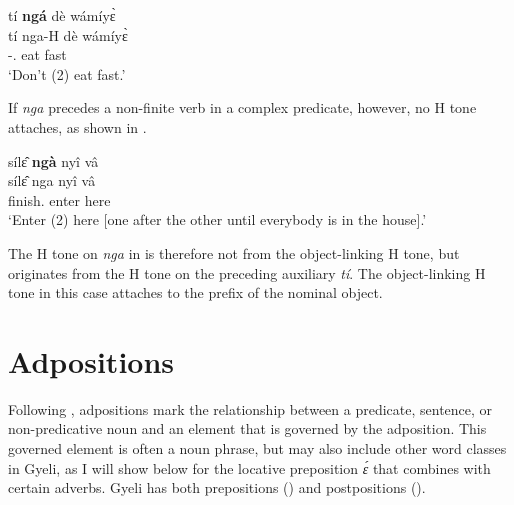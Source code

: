 \ea \label{ngapos1}
  \glll tí {\bfseries ngá} dè wámíyɛ̀ \\
       tí nga-H dè wámíyɛ̀ \\
        {\NEG} {\PL}-{\OBJ}.{\LINK} eat fast \\
    \trans `Don't (2{\PL}) eat fast.'
\z

\noindent If {\itshape nga} precedes a non-finite verb in a complex predicate, however, no H tone attaches, as shown in .

\ea \label{ngapos2}
  \glll sílɛ̂ {\bfseries ngà} nyî vâ \\
       sílɛ̂ nga nyî vâ \\
        finish.{\IMP} {\PL} enter here \\
    \trans `Enter (2{\PL}) here [one after the other until everybody is in the house].'
\z

\noindent The H tone on {\itshape nga} in  is therefore not from the object-linking H tone, but originates from the H tone on the preceding auxiliary {\itshape tí}. The object-linking H tone in this case attaches to the prefix of the nominal object.
















\section{Adpositions} 
\label{sec:Adpos}

Following \citet{hagege2010}, adpositions mark the relationship between a predicate, sentence, or non-predicative noun and an element that is governed by the adposition. This governed element is often a noun phrase, but may also include other word classes in Gyeli, as I will show below for the locative preposition {\itshape ɛ́} that combines with certain adverbs. 
Gyeli has both prepositions () and postpositions (). 

